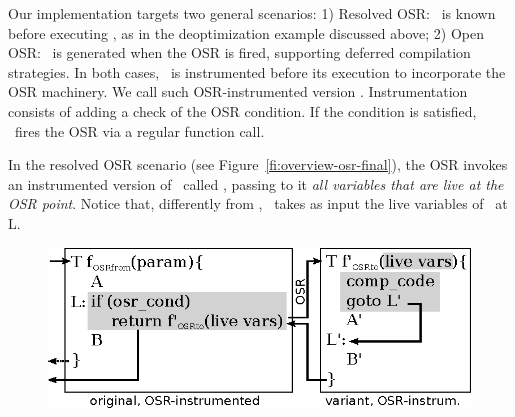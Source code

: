 Our implementation targets two general scenarios: 1) {\sc Resolved OSR}: \fvariant\ is known before executing \fbase, as in the deoptimization example discussed above; 2) {\sc Open OSR}: \fvariant\ is generated when the OSR is fired, supporting deferred compilation strategies. In both cases, \fbase\ is instrumented before its execution to incorporate the OSR machinery. We call such OSR-instrumented version \fosrfrom. Instrumentation consists of adding a check of the OSR condition. If the condition is satisfied, \fosrfrom\ fires the OSR via a regular function call.

In the resolved OSR scenario (see Figure~\ref{fi:overview-osr-final}), the OSR invokes an instrumented version of \fvariant\ called \fosrto, passing to it {\em all variables that are live at the OSR point}. Notice that, differently from \fvariant, \fosrto\ takes as input the live variables of \fbase\ at \textsf{L}.

 


%
%

\ifdefined\noauthorea
\begin{figure}[t]
\begin{center}
\includegraphics[width=0.7\columnwidth]{figures/overview-osr-final/overview-osr-final.eps}
\caption{\protect}
\end{center}
\end{figure}
\fi


